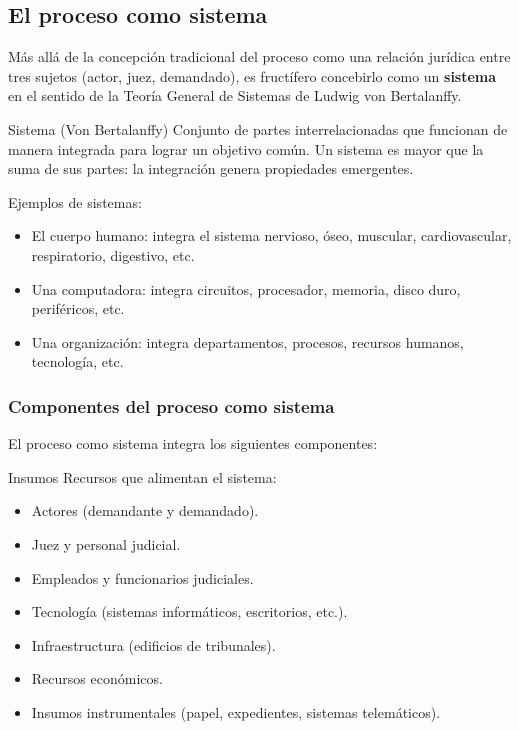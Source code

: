 \documentclass[12pt,oneside]{book}
\begin{document}
\subsection{El proceso como sistema}

Más allá de la concepción tradicional del proceso como una relación jurídica entre tres sujetos (actor, juez, demandado), es fructífero concebirlo como un \textbf{sistema} en el sentido de la Teoría General de Sistemas de Ludwig von Bertalanffy.

\begin{definition}{Sistema (Von Bertalanffy)}
Conjunto de partes interrelacionadas que funcionan de manera integrada para lograr un objetivo común. Un sistema es mayor que la suma de sus partes: la integración genera propiedades emergentes.
\end{definition}

Ejemplos de sistemas:
\begin{itemize}
    \item El cuerpo humano: integra el sistema nervioso, óseo, muscular, cardiovascular, respiratorio, digestivo, etc.
    \item Una computadora: integra circuitos, procesador, memoria, disco duro, periféricos, etc.
    \item Una organización: integra departamentos, procesos, recursos humanos, tecnología, etc.
\end{itemize}

\subsubsection{Componentes del proceso como sistema}

El proceso como sistema integra los siguientes componentes:

\begin{definition}{Insumos}
Recursos que alimentan el sistema:
\begin{itemize}
    \item Actores (demandante y demandado).
    \item Juez y personal judicial.
    \item Empleados y funcionarios judiciales.
    \item Tecnología (sistemas informáticos, escritorios, etc.).
    \item Infraestructura (edificios de tribunales).
    \item Recursos económicos.
    \item Insumos instrumentales (papel, expedientes, sistemas telemáticos).
\end{itemize}
\end{definition}
\end{document}
